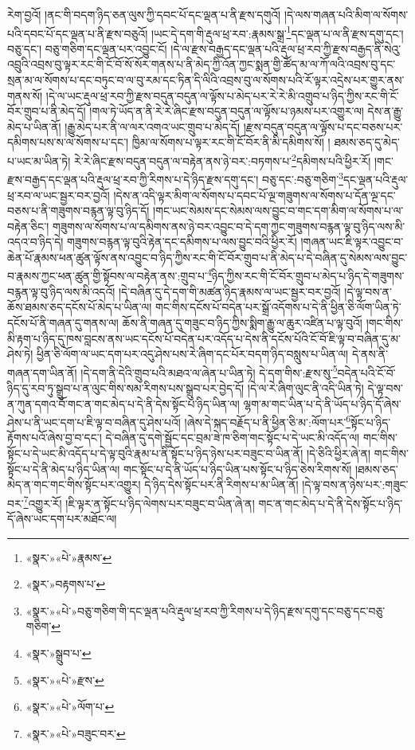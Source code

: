 རེག་བྱའོ། །ནང་གི་བདག་ཉིད་ཅན་ལུས་ཀྱི་དབང་པོ་དང་ལྡན་པ་ནི་རྫས་དགུའོ། །དེ་ལས་གཞན་པའི་མིག་ལ་སོགས་པའི་དབང་པོ་དང་ལྡན་པ་ནི་རྫས་བཅུའོ། །ཡང་དེ་དག་གི་རྡུལ་ཕྲ་རབ་:རྣམས་སྒྲ་\footnote{«སྣར་»«པེ་»རྣམས་}དང་ལྡན་པ་ལ་ནི་རྫས་དགུ་དང་། བཅུ་དང་། བཅུ་གཅིག་དང་ལྡན་པར་འབྱུང་ངོ། །དེ་ལ་རྫས་བརྒྱད་དང་ལྡན་པའི་རྡུལ་ཕྲ་རབ་ཀྱི་རྫས་བརྒྱད་ནི་སེའུ་འབྲུའི་འབྲས་བུ་ལྟར་རང་གི་ངོ་བོ་སོ་སོར་གནས་པ་ནི་མེད་ཀྱི་འོན་ཀྱང་སྨན་གྱི་ཚོད་མ་ལ་ཀོ་ལའི་འབྲས་བུ་དང་སྲན་མ་ལ་སོགས་པ་དང་བཏུང་བ་ལ་བུ་རམ་དང་ཏིན་དི་ལིའི་འབྲས་བུ་ལ་སོགས་པའི་རོ་ལྟར་འདྲེས་པར་གྱུར་ནས་གནས་སོ། །དེ་ལ་ཡང་རྡུལ་ཕྲ་རབ་ཀྱི་རྫས་བདུན་བདུན་ལ་ལྟོས་པ་མེད་པར་རེ་རེ་མི་འགྲུབ་པ་ཉིད་ཀྱིས་རང་གི་ངོ་བོར་གྲུབ་པ་ནི་མེད་དོ། །གལ་ཏེ་ཡོད་ན་ནི་རེ་རེ་ཞིང་རྫས་བདུན་བདུན་ལ་ལྟོས་པ་ཉམས་པར་འགྱུར་ལ། དེས་ན་རྒྱུ་མེད་པ་ཡིན་ནོ། །རྒྱུ་མེད་པར་ནི་ལ་ལར་འགའ་ཡང་གྲུབ་པ་མེད་དོ། །རྫས་བདུན་བདུན་ལ་ལྟོས་པ་དང་བཅས་པར་དམིགས་པས་ས་ལ་སོགས་པ་དང་། ཁྱིམ་ལ་སོགས་པ་ལྟར་རང་གི་ངོ་བོར་ནི་མི་དམིགས་སོ། །
ཐམས་ཅད་དུ་མེད་པ་ཡང་མ་ཡིན་ཏེ། རེ་རེ་ཞིང་རྫས་བདུན་བདུན་ལ་བརྟེན་ནས་ཉེ་བར་:བཏགས་པ་\footnote{«སྣར་»བརྟགས་པ་}དམིགས་པའི་ཕྱིར་རོ། །གང་རྫས་བརྒྱད་དང་ལྡན་པའི་རྡུལ་ཕྲ་རབ་ཀྱི་རིགས་པ་དེ་ཉིད་རྫས་དགུ་དང་། བཅུ་དང་:བཅུ་གཅིག་\footnote{«སྣར་»«པེ་»བཅུ་གཅིག་གི་དང་ལྡན་པའི་རྡུལ་ཕྲ་རབ་ཀྱི་རིགས་པ་དེ་ཉིད་རྫས་དགུ་དང་བཅུ་དང་བཅུ་གཅིག་}དང་ལྡན་པའི་རྡུལ་ཕྲ་རབ་ལ་ཡང་སྦྱར་བར་བྱའོ། །དེས་ན་འདི་ལྟར་མིག་ལ་སོགས་པ་དབང་པོ་ལྔ་གཟུགས་ལ་སོགས་པ་དོན་ལྔ་དང་བཅས་པ་ནི་གཟུགས་བརྙན་ལྟ་བུ་ཉིད་དོ། །གང་ཡང་སེམས་དང་སེམས་ལས་བྱུང་བ་གང་དག་མིག་ལ་སོགས་པ་ལ་བརྟེན་ཅིང་། གཟུགས་ལ་སོགས་པ་ལ་དམིགས་ནས་ཉེ་བར་འབྱུང་བ་དེ་དག་ཀྱང་གཟུགས་བརྙན་ལྟ་བུ་ཉིད་ལས་མི་འདའ་བ་ཉིད་དེ། གཟུགས་བརྙན་ལྟ་བུའི་རྟེན་དང་དམིགས་པ་ལས་བྱུང་བའི་ཕྱིར་རོ། །གཞན་ཡང་ཇི་ལྟར་འབྱུང་བ་ཆེན་པོ་རྣམས་ཕན་ཚུན་ལྟོས་ནས་འབྱུང་བ་ཉིད་ཀྱིས་རང་གི་ངོ་བོར་གྲུབ་པ་ནི་མེད་པ་དེ་བཞིན་དུ་སེམས་ལས་བྱུང་བ་རྣམས་ཀྱང་ཕན་ཚུན་གྱི་སྟོབས་ལ་བརྟེན་ནས་:གྲུབ་པ་\footnote{«སྣར་»སྒྲུབ་པ་}ཉིད་ཀྱིས་རང་གི་ངོ་བོར་གྲུབ་པ་མེད་པ་ཉིད་དེ་གཟུགས་བརྙན་ལྟ་བུ་ཉིད་ལས་མི་འདའོ། །དེ་བཞིན་དུ་དེ་དག་གི་མཚན་ཉིད་རྣམས་ལ་ཡང་སྦྱར་བར་བྱའོ། །དེ་ལྟ་བས་ན་ཆོས་ཐམས་ཅད་དངོས་པོ་མེད་པ་ཡིན་ལ། གང་གིས་དངོས་པོ་བདེན་པར་སྒྲོ་འདོགས་པ་དེ་ནི་ཕྱིན་ཅི་ལོག་ཡིན་ཏེ་དངོས་པོ་ནི་གཞན་དུ་གནས་ལ། ཆོས་ནི་གཞན་དུ་གཟུང་བ་ཉིད་ཀྱིས་སྨིག་རྒྱུ་ལ་ཆུར་འཛིན་པ་ལྟ་བུའོ། །གང་གིས་མི་རྟག་པ་ཉིད་དུ་ཁས་བླངས་ནས་ཡང་དངོས་པོ་བདེན་པར་འདོད་པ་དེས་ནི་དངོས་པོའི་ངོ་བོ་ཇི་ལྟ་བ་བཞིན་དུ་མ་ཤེས་ཏེ། ཕྱིན་ཅི་ལོག་ལ་ཡང་དག་པར་འདུ་ཤེས་པས་རེ་ཞིག་དང་པོར་བདག་ཉིད་བསླུས་པ་ཡིན་ལ། དེ་ནས་ནི་གཞན་དག་ཡིན་ནོ། །དེ་དག་ནི་དེའི་གྲུབ་པའི་མཐའ་ལ་ཞེན་པ་ཡིན་ཏེ། དེ་དག་གིས་:རྫས་སུ་\footnote{«སྣར་»«པེ་»རྫས་}བདེན་པའི་ངོ་བོ་ཉིད་དུ་རབ་ཏུ་སྒྲུབ་པ་ན་ལུང་གིས་སམ་རིགས་པས་སྒྲུབ་པར་བྱེད་དོ། །དེ་ལ་རེ་ཞིག་ལུང་ནི་འདི་ཡིན་ཏེ། དེ་ལྟ་བས་ན་ཀུན་དགའ་བོ་གང་ན་གང་མེད་པ་དེ་ནི་དེས་སྟོང་པ་ཉིད་ཡིན་ལ། ལྷག་མ་གང་ཡིན་པ་དེ་ནི་ཡོད་པ་ཉིད་དོ་ཞེས་ཤེས་པ་ནི་ཡང་དག་པ་ཇི་ལྟ་བ་བཞིན་དུ་ཤེས་པའོ། །ཞེས་དེ་སྐད་བརྗོད་པ་ནི་ཕྱིན་ཅི་མ་:ལོག་པར་\footnote{«སྣར་»«པེ་»ལོག་པ་}སྟོང་པ་ཉིད་རྟོགས་པའོ་ཞེས་བྱ་བ་དང་། དེ་བཞིན་དུ་དགེ་སྦྱོང་དང་བྲམ་ཟེ་ཁ་ཅིག་གང་སྟོང་པ་དེ་ཡང་མི་འདོད་ལ། གང་གིས་སྟོང་པ་དེ་ཡང་མི་འདོད་པ་དེ་ལྟ་བུའི་རྣམ་པ་ནི་སྟོང་པ་ཉིད་ཉེས་པར་བཟུང་བ་ཡིན་ནོ། །དེ་ཅིའི་ཕྱིར་ཞེ་ན། གང་གིས་སྟོང་པ་དེ་ནི་མེད་པ་ཉིད་ཡིན་ལ། གང་སྟོང་པ་དེ་ནི་ཡོད་པ་ཉིད་ཡིན་པས་སྟོང་པ་ཉིད་ཅེས་རིགས་སོ། །ཐམས་ཅད་མེད་ན་གང་གང་གིས་སྟོང་པར་འགྱུར། དེ་ཉིད་དེས་སྟོང་པར་ནི་རིགས་པ་མ་ཡིན་ནོ། །དེ་ལྟ་བས་ན་ཉེས་པར་:གཟུང་བར་\footnote{«སྣར་»«པེ་»བཟུང་བར་}འགྱུར་རོ། །ཇི་ལྟར་ན་སྟོང་པ་ཉིད་ལེགས་པར་བཟུང་བ་ཡིན་ཞེ་ན། གང་ན་གང་མེད་པ་དེ་ནི་དེས་སྟོང་པ་ཉིད་དོ་ཞེས་ཡང་དག་པར་མཐོང་ལ། 